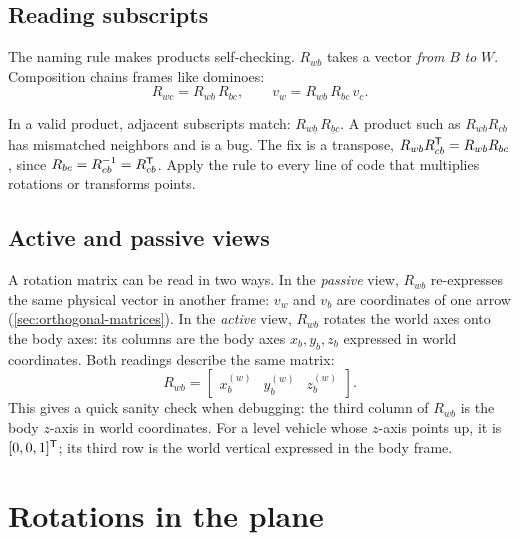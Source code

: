 \subsection{Reading subscripts}

The naming rule  makes products self-checking. $R_{wb}$ takes a vector \emph{from} $B$ \emph{to} $W$. Composition
chains frames like dominoes:
\begin{equation}
  R_{wc} = R_{wb}\,R_{bc}, \qquad v_w = R_{wb}\,R_{bc}\,v_c .
\end{equation}

\begin{keyidea}
In a valid product, adjacent subscripts match: $R_{w\underline{b}}\,R_{\underline{b}c}$. A product such as $R_{wb}R_{cb}$ has mismatched neighbors and is
a bug. The fix is a transpose, $R_{wb}R_{cb}^{\mathsf{T}} = R_{wb}R_{bc}$, since $R_{bc} = R_{cb}^{-1} = R_{cb}^{\mathsf{T}}$. Apply the rule to every line of code that
multiplies rotations or transforms points.
\end{keyidea}

\subsection{Active and passive views}

A rotation matrix can be read in two ways. In the \emph{passive} view, $R_{wb}$ re-expresses the same physical vector in another frame:
$v_w$ and $v_b$ are coordinates of one arrow (\cref{sec:orthogonal-matrices}). In the \emph{active} view, $R_{wb}$ rotates the world axes
onto the body axes: its columns are the body axes $x_b, y_b, z_b$ expressed in world coordinates. Both readings describe the same matrix:
\begin{equation}
  R_{wb} = \begin{bmatrix} x_b^{(w)} & y_b^{(w)} & z_b^{(w)} \end{bmatrix}.
\end{equation}
This gives a quick sanity check when debugging: the third column of $R_{wb}$ is the body $z$-axis in world coordinates. For a level
vehicle whose $z$-axis points up, it is $[0,0,1]^{\mathsf{T}}$; its third row is the world vertical expressed in the body frame.

\section{Rotations in the plane}

